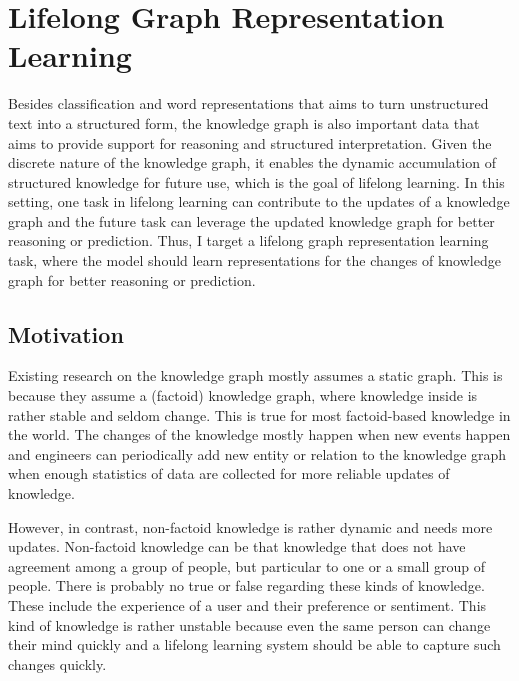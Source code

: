 \chapter{Lifelong Graph Representation Learning}
\label{chap5:graph}

Besides classification and word representations that aims to turn unstructured text into a structured form, the knowledge graph is also important data that aims to provide support for reasoning and structured interpretation.
Given the discrete nature of the knowledge graph, it enables the dynamic accumulation of structured knowledge for future use, which is the goal of lifelong learning.
In this setting, one task in lifelong learning can contribute to the updates of a knowledge graph and the future task can leverage the updated knowledge graph for better reasoning or prediction.
Thus, I target a lifelong graph representation learning task, where the model should learn representations for the changes of knowledge graph for better reasoning or prediction.

\section{Motivation}

Existing research on the knowledge graph mostly assumes a static graph.
This is because they assume a (factoid) knowledge graph, where knowledge inside is rather stable and seldom change.
This is true for most factoid-based knowledge in the world.
The changes of the knowledge mostly happen when new events happen and engineers can periodically add new entity or relation to the knowledge graph when enough statistics of data are collected for more reliable updates of knowledge.

However, in contrast, non-factoid knowledge is rather dynamic and needs more updates.
Non-factoid knowledge can be that knowledge that does not have agreement among a group of people, but particular to one or a small group of people.
There is probably no true or false regarding these kinds of knowledge.
These include the experience of a user and their preference or sentiment.
This kind of knowledge is rather unstable because even the same person can change their mind quickly and a lifelong learning system should be able to capture such changes quickly.

